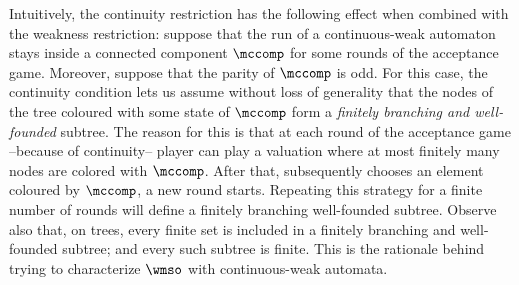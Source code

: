 Intuitively, the continuity restriction has the following effect when combined with the weakness restriction: suppose that the run of a continuous-weak automaton stays inside a connected component $\mccomp$ for some rounds of the acceptance game. Moreover, suppose that the parity of $\mccomp$ is odd. For this case, the continuity condition lets us assume without loss of generality that the nodes of the tree coloured with some state of $\mccomp$ form a \emph{finitely branching and well-founded} subtree. The reason for this is that at each round of the acceptance game --because of continuity-- player \eloise can play a valuation where at most finitely many nodes are colored with $\mccomp$. After that, \abelard subsequently chooses an element coloured by $\mccomp$, a new round starts. Repeating this strategy for a finite number of rounds will define a finitely branching well-founded subtree. Observe also that, on trees, every finite set is included in a finitely branching and well-founded subtree; and every such subtree is finite. This is the rationale behind trying to characterize $\wmso$ with continuous-weak automata.
